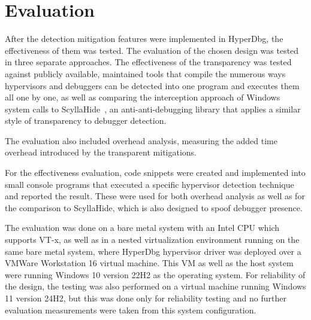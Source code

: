 \section{Evaluation}\label{s:evaluation}

After the detection mitigation features were implemented in HyperDbg, the effectiveness of them was tested. The evaluation of the chosen design was tested in three 
separate approaches. The effectiveness of the transparency was tested against publicly available, maintained tools that compile the numerous ways hypervisors 
and debuggers can be detected into one program and executes them all one by one, as well as comparing the interception approach of Windows system calls to 
ScyllaHide~\cite{scyllahide}, an anti-anti-debugging library that applies 
a similar style of transparency to debugger detection.

The evaluation also included overhead analysis, measuring the added time overhead introduced by the transparent mitigations.

For the effectiveness evaluation, code snippets were created and implemented into small console programs that executed a specific hypervisor detection technique 
and reported the result. These were used for both overhead analysis as well as for the comparison to ScyllaHide, which is also designed to spoof debugger presence.

The evaluation was done on a bare metal system with an Intel CPU which supports VT-x, as well as in a nested virtualization environment running on the same bare metal system, 
where HyperDbg hypervisor driver was deployed over a VMWare Workstation 16 virtual machine. This VM as well as the host system were running Windows 10 version 22H2 as the operating system. 
For reliability of the design, the testing was also performed on a virtual machine running Windows 11 version 24H2, 
but this was done only for reliability testing and no further evaluation measurements were taken from this system configuration. 

